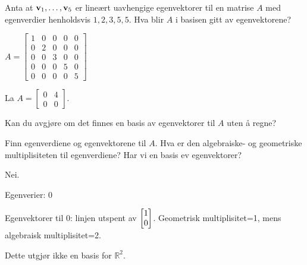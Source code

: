

\begin{oppgave}
Anta at $\mathbf{v}_1,\dots,\mathbf{v}_5$ er lineært uavhengige egenvektorer til en matrise $A$ med egenverdier henholdsvis $1,2,3,5,5$.  Hva blir $A$ i basisen gitt av egenvektorene?

\end{oppgave}

\begin{losning}
$A=\begin{bmatrix}
1 & 0 & 0 & 0 & 0\\
0 & 2 & 0 & 0 & 0\\
0 & 0 & 3 & 0 & 0\\
0 & 0 & 0 & 5 & 0\\
0 & 0 & 0 & 0 & 5
\end{bmatrix}$
\end{losning}



\begin{oppgave}
La $A=\begin{bmatrix}
0 & 4\\
0 & 0
\end{bmatrix}$. 

\begin{punkt}
Kan du avgjøre om det finnes en basis av egenvektorer til $A$ uten å regne?
\end{punkt}

\begin{punkt}
Finn egenverdiene og egenvektorene til $A$. Hva er den algebraiske- og geometriske multiplisiteten til egenverdiene? Har vi en basis ev egenvektorer?
\end{punkt}
\end{oppgave}

\begin{losning}
\begin{punkt}
Nei.
\end{punkt}

\begin{punkt}
Egenverier: 0

\noindent
Egenvektorer til  0: linjen utspent av $\begin{bmatrix} 1 \\ 0 \end{bmatrix}$. Geometrisk multiplisitet=1, mens algebraisk multiplisitet=2.

\noindent
Dette utgjør ikke en basis for $\mathbb{R}^2$.
\end{punkt}

\end{losning}

